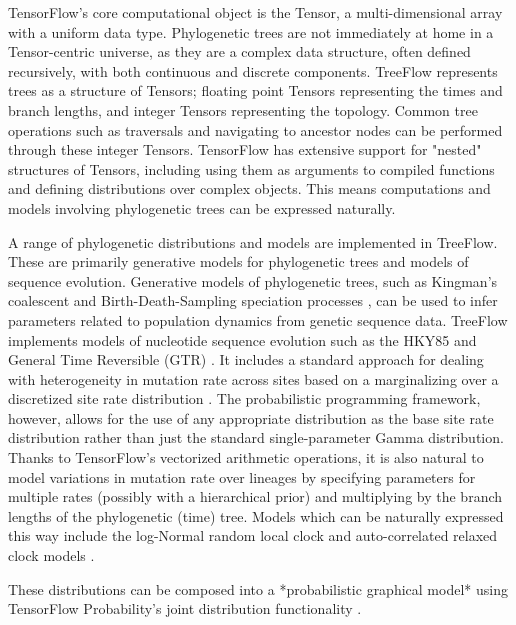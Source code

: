 TensorFlow's core computational object is the Tensor, a multi-dimensional array with a uniform data type. Phylogenetic trees are not immediately at home in a Tensor-centric universe, as they are a complex data structure, often defined recursively, with both continuous and discrete components. TreeFlow represents trees as a structure of Tensors; floating point Tensors representing the times and branch lengths, and integer Tensors representing the topology. Common tree operations such as traversals and navigating to ancestor nodes can be performed through these integer Tensors. TensorFlow has extensive support for "nested" structures of Tensors, including using them as arguments to compiled functions and defining distributions over complex objects. This means computations and models involving phylogenetic trees can be expressed naturally.

A range of phylogenetic distributions and models are implemented in TreeFlow. These are primarily generative models for phylogenetic trees and models of sequence evolution. Generative models of phylogenetic trees, such as Kingman's coalescent \cite{kuhner1995estimating} and Birth-Death-Sampling speciation processes \cite{stadler2009incomplete}, can be used to infer parameters related to population dynamics from genetic sequence data. TreeFlow implements models of nucleotide sequence evolution such as the HKY85 \cite{hasegawa1985dating} and General Time Reversible (GTR) \cite{tavare1986some}. It includes a standard approach for dealing with heterogeneity in mutation rate across sites based on a marginalizing over a discretized site rate distribution \cite{yang1994maximum}. The probabilistic programming framework, however, allows for the use of any appropriate distribution as the base site rate distribution rather than just the standard single-parameter Gamma distribution. Thanks to TensorFlow's vectorized arithmetic operations, it is also natural to model variations in mutation rate over lineages by specifying parameters for multiple rates (possibly with a hierarchical prior) and multiplying by the branch lengths of the phylogenetic (time) tree. Models which can be naturally expressed this way include the log-Normal random local clock \cite{drummond2006relaxed} and auto-correlated relaxed clock models \cite{thorne1998estimating}.

These distributions can be composed into a *probabilistic graphical model* using TensorFlow Probability's joint distribution functionality \cite{piponi2020joint}.



